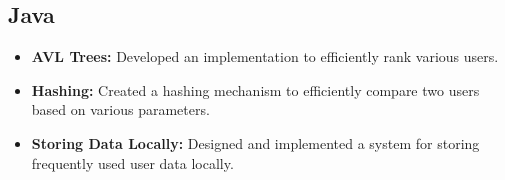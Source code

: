 \documentclass{article}
\begin{document}
\subsection*{Java}
\begin{itemize}
    \item \textbf{AVL Trees:} Developed an implementation to efficiently rank various users.
    \item \textbf{Hashing:} Created a hashing mechanism to efficiently compare two users based on various parameters.
    \item \textbf{Storing Data Locally:} Designed and implemented a system for storing frequently used user data locally.
\end{itemize}
\end{document}
